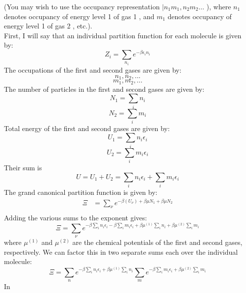 \documentclass[12pt]{article}
\begin{document}
(You may wish to use the occupancy representation $\mid n_{1} m_{1}, n_{2} m_{2} \ldots$ ), where $n_{1}$ denotes occupancy of energy level 1 of gas 1 , and $m_{1}$ denotes occupancy of energy level 1 of gas 2 , etc.).\\
First, I will say that an individual partition function for each molecule is given by:
\begin{equation}
  Z_i = \sum_{n_i} e^{-\beta \epsilon_i n_i}
\end{equation}
The occupations of the first and second gases are given by:
\begin{equation}
  n_1, n_2,...
\end{equation}
\begin{equation}
  m_1, m_2,...
\end{equation}
The number of particles in the first and second gases are given by:
\begin{equation}
  N_1 = \sum_{i} n_i
\end{equation}
\begin{equation}
  N_2 = \sum_{i} m_i
\end{equation}
Total energy of the first and second gases are given by:
\begin{equation}
  U_1 = \sum_{i} n_i \epsilon_i
\end{equation}
\begin{equation}
  U_2 = \sum_{i} m_i \epsilon_i
\end{equation}
Their sum is
\begin{equation}
  U = U_1 + U_2 = \sum_{i} n_i \epsilon_i + \sum_{i} m_i \epsilon_i
\end{equation}
The grand canonical partition function is given by:
\begin{equation}
  \begin{aligned}
    \Xi &= \sum_{\nu} e^{-\beta(U_{\nu}) +  \beta \mu N_{1} + \beta \mu N_{2}} \\
\end{aligned}
\end{equation}
Adding the various sums to the exponent gives:
\begin{equation}
  \Xi = \sum_{\nu} e^{-\beta \sum_{i} n_i \epsilon_i - \beta \sum_{i} m_i \epsilon_i +  \beta \mu^{(1)} \sum_{i} n_i + \beta \mu^{(2)} \sum_{i} m_i}
\end{equation}
where $\mu^{(1)}$ and $\mu^{(2)}$ are the chemical potentials of the first and second gases, respectively. We can factor this in two separate sums each over the individual molecule:
\begin{equation}
  \Xi = \sum_{{n}} e^{-\beta \sum_{i} n_i \epsilon_i +  \beta \mu^{(1)} \sum_{i} n_i} \sum_{{m}}e^{-\beta \sum_{i} m_i \epsilon_i +  \beta \mu^{(2)} \sum_{i} m_i} 
\end{equation}
In 
\end{document}
